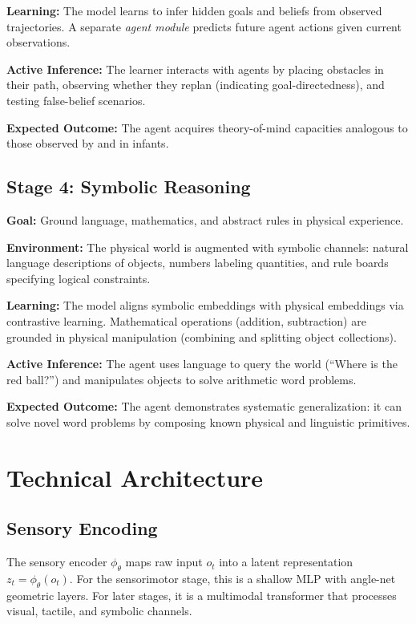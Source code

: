 \documentclass[11pt,oneside]{article}
\begin{document}
\textbf{Learning:} The model learns to infer hidden goals and beliefs from observed trajectories. A separate \emph{agent module} predicts future agent actions given current observations.

\textbf{Active Inference:} The learner interacts with agents by placing obstacles in their path, observing whether they replan (indicating goal-directedness), and testing false-belief scenarios.

\textbf{Expected Outcome:} The agent acquires theory-of-mind capacities analogous to those observed by \citet{onishi2005believing} and \citet{baron1995belief} in infants.

\subsection{Stage 4: Symbolic Reasoning}

\textbf{Goal:} Ground language, mathematics, and abstract rules in physical experience.

\textbf{Environment:} The physical world is augmented with symbolic channels: natural language descriptions of objects, numbers labeling quantities, and rule boards specifying logical constraints.

\textbf{Learning:} The model aligns symbolic embeddings with physical embeddings via contrastive learning. Mathematical operations (addition, subtraction) are grounded in physical manipulation (combining and splitting object collections).

\textbf{Active Inference:} The agent uses language to query the world (``Where is the red ball?'') and manipulates objects to solve arithmetic word problems.

\textbf{Expected Outcome:} The agent demonstrates systematic generalization: it can solve novel word problems by composing known physical and linguistic primitives.

\section{Technical Architecture}

\subsection{Sensory Encoding}

The sensory encoder $\phi_\theta$ maps raw input $o_t$ into a latent representation $z_t = \phi_\theta(o_t)$. For the sensorimotor stage, this is a shallow MLP with angle-net geometric layers. For later stages, it is a multimodal transformer that processes visual, tactile, and symbolic channels.
\end{document}

